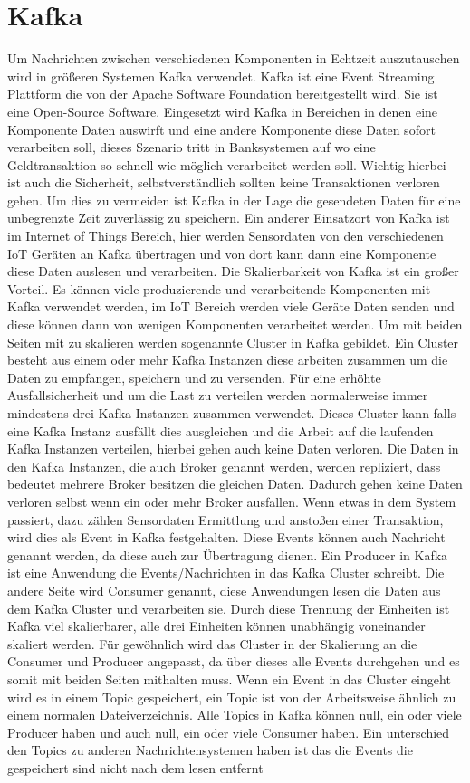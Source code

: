 \chapter{Kafka}
Um Nachrichten zwischen verschiedenen Komponenten in Echtzeit auszutauschen wird in größeren Systemen Kafka verwendet. Kafka ist eine Event Streaming Plattform die von der Apache Software Foundation bereitgestellt wird. Sie ist eine Open-Source Software. Eingesetzt wird Kafka in Bereichen in denen eine Komponente Daten auswirft und eine andere Komponente diese Daten sofort verarbeiten soll, dieses Szenario tritt in Banksystemen auf wo eine Geldtransaktion so schnell wie möglich verarbeitet werden soll. Wichtig hierbei ist auch die Sicherheit, selbstverständlich sollten keine Transaktionen verloren gehen. Um dies zu vermeiden ist Kafka in der Lage die gesendeten Daten für eine unbegrenzte Zeit zuverlässig zu speichern. Ein anderer Einsatzort von Kafka ist im Internet of Things Bereich, hier werden Sensordaten von den verschiedenen IoT Geräten an Kafka übertragen und von dort kann dann eine Komponente diese Daten auslesen und verarbeiten. Die Skalierbarkeit von Kafka ist ein großer Vorteil. Es können viele produzierende und verarbeitende Komponenten mit Kafka verwendet werden, im IoT Bereich werden viele Geräte Daten senden und diese können dann von wenigen Komponenten verarbeitet werden. Um mit beiden Seiten mit zu skalieren werden sogenannte Cluster in Kafka gebildet. Ein Cluster besteht aus einem oder mehr Kafka Instanzen diese arbeiten zusammen um die Daten zu empfangen, speichern und zu versenden. Für eine erhöhte Ausfallsicherheit und um die Last zu verteilen werden normalerweise immer mindestens drei Kafka Instanzen zusammen verwendet. Dieses Cluster kann falls eine Kafka Instanz ausfällt dies ausgleichen und die Arbeit auf die laufenden Kafka Instanzen verteilen, hierbei gehen auch keine Daten verloren. Die Daten in den Kafka Instanzen, die auch Broker genannt werden, werden repliziert, dass bedeutet mehrere Broker besitzen die gleichen Daten. Dadurch gehen keine Daten verloren selbst wenn ein oder mehr Broker ausfallen. Wenn etwas in dem System passiert, dazu zählen Sensordaten Ermittlung und anstoßen einer Transaktion, wird dies als Event in Kafka festgehalten. Diese Events können auch Nachricht genannt werden, da diese auch zur Übertragung dienen. Ein Producer in Kafka ist eine Anwendung die Events/Nachrichten in das Kafka Cluster schreibt. Die andere Seite wird Consumer genannt, diese Anwendungen lesen die Daten aus dem Kafka Cluster und verarbeiten sie. Durch diese Trennung der Einheiten ist Kafka viel skalierbarer, alle drei Einheiten können unabhängig voneinander skaliert werden. Für gewöhnlich wird das Cluster in der Skalierung an die Consumer und Producer angepasst, da über dieses alle Events durchgehen und es somit mit beiden Seiten mithalten muss. Wenn ein Event in das Cluster eingeht wird es in einem Topic gespeichert, ein Topic ist von der Arbeitsweise ähnlich zu einem normalen Dateiverzeichnis. Alle Topics in Kafka können null, ein oder viele Producer haben und auch null, ein oder viele Consumer haben. Ein unterschied den Topics zu anderen Nachrichtensystemen haben ist das die Events die gespeichert sind nicht nach dem lesen entfernt 